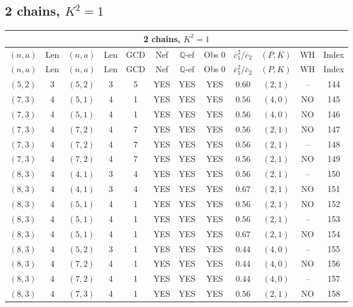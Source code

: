 \subsection{2 chains, $K^2 = 1$}
\begin{longtable}{|c|c|c|c|c|c|c|c|c|c|c|c|}
\hline
\multicolumn{12}{|c|}{2 chains, $K^2 = 1$}\\
\hline
$(n,a)$ & Len & $(n,a)$ & Len & GCD & Nef & $\mathbb Q$-ef & Obs 0 & $\overline c_1^2 / \overline c_2$ & $(P,K)$ & WH & Index\\
\hline
\endfirsthead

\hline
$(n,a)$ & Len & $(n,a)$ & Len & GCD & Nef & $\mathbb Q$-ef & Obs 0 & $\overline c_1^2 / \overline c_2$ & $(P,K)$ & WH & Index\\
\hline
\endhead
\hline
\endfoot

$(5,2)$ & 3 & $(5,2)$ & 3 & 5 & YES & YES & YES & $0.60$ & $(2,1)$ & -- & 144\\
$(7,3)$ & 4 & $(5,1)$ & 4 & 1 & YES & YES & YES & $0.56$ & $(4,0)$ & NO & 145\\
$(7,3)$ & 4 & $(5,1)$ & 4 & 1 & YES & YES & YES & $0.56$ & $(4,0)$ & NO & 146\\
$(7,3)$ & 4 & $(7,2)$ & 4 & 7 & YES & YES & YES & $0.56$ & $(2,1)$ & NO & 147\\
$(7,3)$ & 4 & $(7,2)$ & 4 & 7 & YES & YES & YES & $0.56$ & $(2,1)$ & -- & 148\\
$(7,3)$ & 4 & $(7,2)$ & 4 & 7 & YES & YES & YES & $0.56$ & $(2,1)$ & NO & 149\\
$(8,3)$ & 4 & $(4,1)$ & 3 & 4 & YES & YES & YES & $0.56$ & $(2,1)$ & -- & 150\\
$(8,3)$ & 4 & $(4,1)$ & 3 & 4 & YES & YES & YES & $0.67$ & $(2,1)$ & NO & 151\\
$(8,3)$ & 4 & $(5,1)$ & 4 & 1 & YES & YES & YES & $0.56$ & $(2,1)$ & NO & 152\\
$(8,3)$ & 4 & $(5,1)$ & 4 & 1 & YES & YES & YES & $0.56$ & $(2,1)$ & -- & 153\\
$(8,3)$ & 4 & $(5,1)$ & 4 & 1 & YES & YES & YES & $0.67$ & $(2,1)$ & NO & 154\\
$(8,3)$ & 4 & $(5,2)$ & 3 & 1 & YES & YES & YES & $0.44$ & $(4,0)$ & -- & 155\\
$(8,3)$ & 4 & $(7,2)$ & 4 & 1 & YES & YES & YES & $0.44$ & $(4,0)$ & NO & 156\\
$(8,3)$ & 4 & $(7,2)$ & 4 & 1 & YES & YES & YES & $0.44$ & $(4,0)$ & -- & 157\\
$(8,3)$ & 4 & $(7,3)$ & 4 & 1 & YES & YES & YES & $0.56$ & $(2,1)$ & NO & 158\\

\end{longtable}
